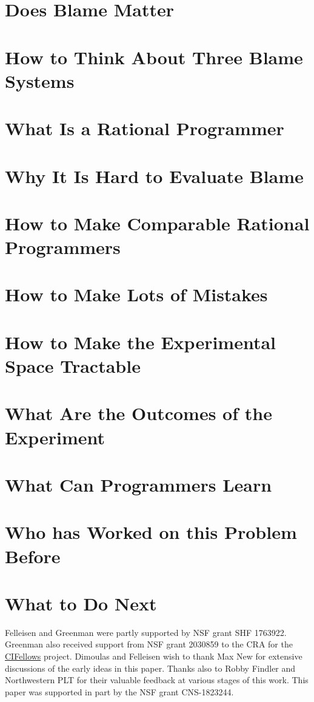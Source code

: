 \documentclass[acmsmall]{acmart}
\begin{document}


\maketitle

\def\sec#1#2{\section{#2} \label{sec:#1} }

\sec{introduction}{Does Blame Matter}

\sec{landscape}   {How to Think About Three Blame Systems}
\sec{why-rational}{What Is a Rational Programmer}
\sec{challenges}  {Why It Is Hard to Evaluate Blame}
\sec{rational}    {How to Make Comparable Rational Programmers}
\sec{mutate}      {How to Make Lots of Mistakes}
\sec{sample}      {How to Make the Experimental Space Tractable}
\sec{results}     {What Are the Outcomes of the Experiment}
\sec{discussion}  {What Can Programmers Learn}
\sec{related}     {Who has Worked on this Problem Before}
\sec{conclusion}  {What to Do Next}

\begin{acks}                 
Felleisen and Greenman were partly supported by NSF grant SHF
1763922.
Greenman also received support from NSF grant 2030859 to the CRA for the
\href{https://cifellows2020.org}{CIFellows} project.
Dimoulas and Felleisen wish to thank Max New for
extensive discussions of the early ideas in this paper. Thanks also to
Robby Findler and Northwestern PLT for their valuable feedback at
various stages of this work.
This paper was supported in part by the NSF grant CNS-1823244.
\end{acks}



\end{document}
